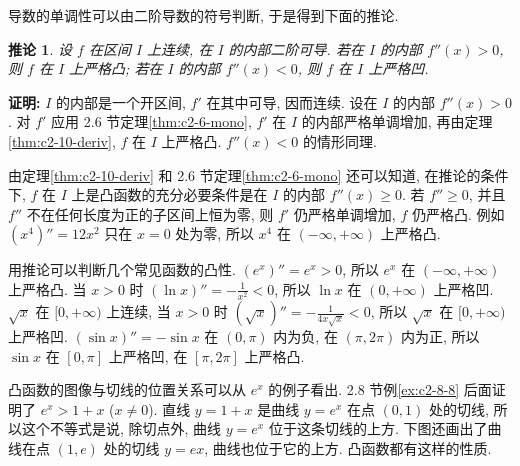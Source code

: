 \documentclass[UTF8,openany]{ctexbook}
\theoremstyle{chinesetextbook}
\newenvironment{cnproof}{\par\indent\textbf{证明:} \ignorespaces}{\par}
\newtheorem*{corollarysingle}{推论}
\begin{document}
导数的单调性可以由二阶导数的符号判断, 于是得到下面的推论.
\begin{corollarysingle}
设 $f$ 在区间 $I$ 上连续, 在 $I$ 的内部二阶可导. 若在 $I$ 的内部 $f''(x)>0$, 则 $f$ 在 $I$ 上严格凸; 若在 $I$ 的内部 $f''(x)<0$, 则 $f$ 在 $I$ 上严格凹.
\end{corollarysingle}
\begin{cnproof}
$I$ 的内部是一个开区间, $f'$ 在其中可导, 因而连续. 设在 $I$ 的内部 $f''(x)>0$. 对 $f'$ 应用 2.6 节定理\ref{thm:c2-6-mono}, $f'$ 在 $I$ 的内部严格单调增加, 再由定理\ref{thm:c2-10-deriv}, $f$ 在 $I$ 上严格凸. $f''(x)<0$ 的情形同理.
\end{cnproof}
由定理\ref{thm:c2-10-deriv} 和 2.6 节定理\ref{thm:c2-6-mono} 还可以知道, 在推论的条件下, $f$ 在 $I$ 上是凸函数的充分必要条件是在 $I$ 的内部 $f''(x)\ge0$. 若 $f''\ge0$, 并且 $f''$ 不在任何长度为正的子区间上恒为零, 则 $f'$ 仍严格单调增加, $f$ 仍严格凸. 例如 $(x^4)''=12x^2$ 只在 $x=0$ 处为零, 所以 $x^4$ 在 $(-\infty,+\infty)$ 上严格凸.

用推论可以判断几个常见函数的凸性. $(e^x)''=e^x>0$, 所以 $e^x$ 在 $(-\infty,+\infty)$ 上严格凸. 当 $x>0$ 时 $\displaystyle(\ln x)''=-\frac1{x^2}<0$, 所以 $\ln x$ 在 $(0,+\infty)$ 上严格凹. $\sqrt x$ 在 $[0,+\infty)$ 上连续, 当 $x>0$ 时 $\displaystyle(\sqrt x)''=-\frac1{4x\sqrt x}<0$, 所以 $\sqrt x$ 在 $[0,+\infty)$ 上严格凹. $(\sin x)''=-\sin x$ 在 $(0,\pi)$ 内为负, 在 $(\pi,2\pi)$ 内为正, 所以 $\sin x$ 在 $[0,\pi]$ 上严格凹, 在 $[\pi,2\pi]$ 上严格凸.

凸函数的图像与切线的位置关系可以从 $e^x$ 的例子看出. 2.8 节例\ref{ex:c2-8-8} 后面证明了 $e^x>1+x$ ($x\ne0$). 直线 $y=1+x$ 是曲线 $y=e^x$ 在点 $(0,1)$ 处的切线, 所以这个不等式是说, 除切点外, 曲线 $y=e^x$ 位于这条切线的上方. 下图还画出了曲线在点 $(1,e)$ 处的切线 $y=ex$, 曲线也位于它的上方. 凸函数都有这样的性质.
\begin{center}
\end{center}
\end{document}
